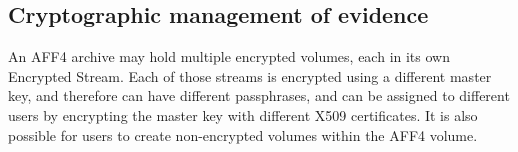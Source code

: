\documentclass[10pt, conference]{IEEEtran}
\begin{document}
{{%






\subsection{Cryptographic management of evidence}
An AFF4 archive may hold multiple encrypted volumes, each in its own
Encrypted Stream. Each of those streams is encrypted using a different
master key, and therefore can have different passphrases, and can be
assigned to different users by encrypting the master key with
different X509 certificates. It is also possible for users to create
non-encrypted volumes within the AFF4 volume.

}}
\end{document}
